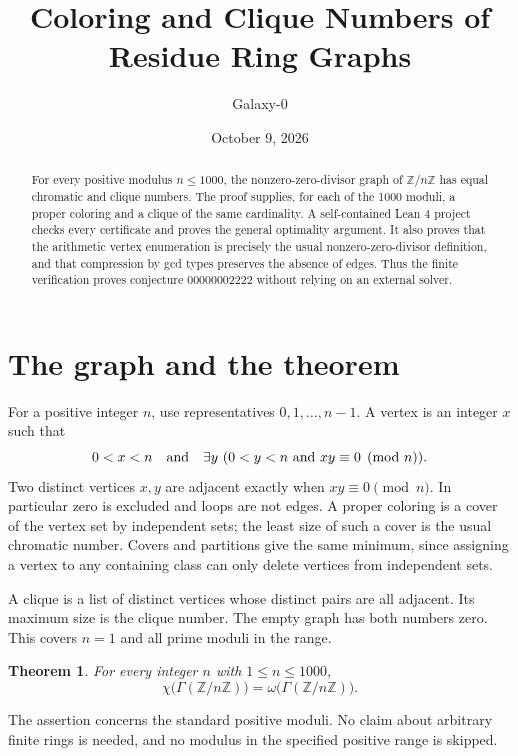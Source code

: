 \documentclass[10pt]{article}
\title{Coloring and Clique Numbers of Residue Ring Graphs}
\author{Galaxy-0}
\date{October 9, 2026}
\newtheorem{theorem}{Theorem}
\begin{document}
\maketitle
\begin{abstract}
For every positive modulus $n\le1000$, the nonzero-zero-divisor graph of $\mathbb Z/n\mathbb Z$ has equal chromatic and clique numbers. The proof supplies, for each of the 1000 moduli, a proper coloring and a clique of the same cardinality. A self-contained Lean 4 project checks every certificate and proves the general optimality argument. It also proves that the arithmetic vertex enumeration is precisely the usual nonzero-zero-divisor definition, and that compression by gcd types preserves the absence of edges. Thus the finite verification proves conjecture 00000002222 without relying on an external solver.
\end{abstract}
\section{The graph and the theorem}
For a positive integer $n$, use representatives $0,1,\ldots,n-1$. A vertex is an integer $x$ such that
\[
 0<x<n\quad\hbox{and}\quad
 \exists y\ (0<y<n\ \hbox{and}\ xy\equiv0\pmod n).
\]
Two distinct vertices $x,y$ are adjacent exactly when $xy\equiv0\pmod n$. In particular zero is excluded and loops are not edges. A proper coloring is a cover of the vertex set by independent sets; the least size of such a cover is the usual chromatic number. Covers and partitions give the same minimum, since assigning a vertex to any containing class can only delete vertices from independent sets.

A clique is a list of distinct vertices whose distinct pairs are all adjacent. Its maximum size is the clique number. The empty graph has both numbers zero. This covers $n=1$ and all prime moduli in the range.
\begin{theorem}
For every integer $n$ with $1\le n\le1000$,
\[
 \chi\bigl(\Gamma(\mathbb Z/n\mathbb Z)\bigr)
 =\omega\bigl(\Gamma(\mathbb Z/n\mathbb Z)\bigr).
\]
\end{theorem}
The assertion concerns the standard positive moduli. No claim about arbitrary finite rings is needed, and no modulus in the specified positive range is skipped.
\end{document}
